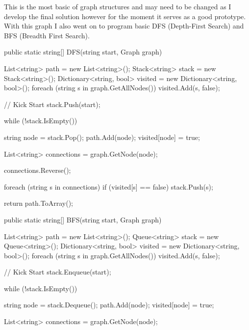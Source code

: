 \begin{flushleft}

        This is the most basic of graph structures and may need to be changed as I develop the final solution however for the moment it serves as a good prototype. With this graph I also went on to program basic DFS (Depth-First Search) and BFS (Breadth First Search). \\ \bk

        \begin{cscode}
public static string[] DFS(string start, Graph graph)
{
    List<string> path = new List<string>();
    Stack<string> stack = new Stack<string>();
    Dictionary<string, bool> visited = new Dictionary<string, bool>();
    foreach (string s in graph.GetAllNodes()) visited.Add(s, false);

    // Kick Start
    stack.Push(start);

    while (!stack.IsEmpty())
    {

        string node = stack.Pop();
        path.Add(node);
        visited[node] = true;

        List<string> connections = graph.GetNode(node);

        connections.Reverse();

        foreach (string s in connections)
        {
            if (visited[s] == false)
            {
                stack.Push(s);
            }
        }
    }


    return path.ToArray();
}

public static string[] BFS(string start, Graph graph)
{
    List<string> path = new List<string>();
    Queue<string> stack = new Queue<string>();
    Dictionary<string, bool> visited = new Dictionary<string, bool>();
    foreach (string s in graph.GetAllNodes()) visited.Add(s, false);

    // Kick Start
    stack.Enqueue(start);

    while (!stack.IsEmpty())
    {

        string node = stack.Dequeue();
        path.Add(node);
        visited[node] = true;

        List<string> connections = graph.GetNode(node);

}}
\end{cscode}
\end{flushleft}
